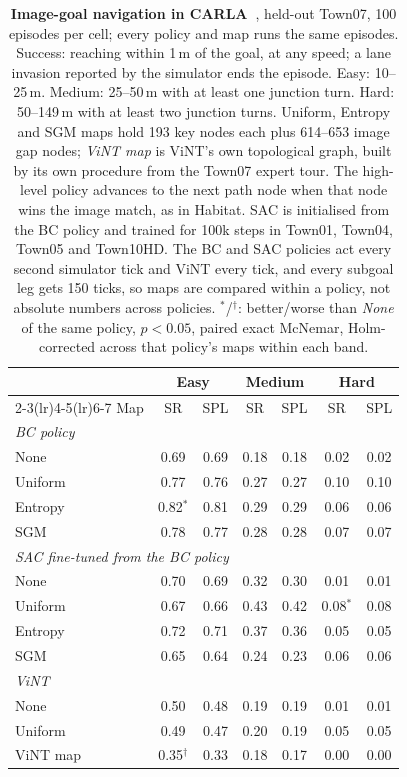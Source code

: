 \begin{table}[H]
\centering
\footnotesize
\setlength{\tabcolsep}{3.5pt}
\caption{\textbf{Image-goal navigation in CARLA~\cite{dosovitskiy2017carla}}, held-out Town07, 100 episodes per cell; every policy and map runs the same episodes. Success: reaching within 1\,m of the goal, at any speed; a lane invasion reported by the simulator ends the episode. Easy: 10--25\,m. Medium: 25--50\,m with at least one junction turn. Hard: 50--149\,m with at least two junction turns. Uniform, Entropy and SGM maps hold 193 key nodes each plus 614--653 image gap nodes; \emph{ViNT map} is ViNT's own topological graph, built by its own procedure from the Town07 expert tour. The high-level policy advances to the next path node when that node wins the image match, as in Habitat. SAC is initialised from the BC policy and trained for 100k steps in Town01, Town04, Town05 and Town10HD. The BC and SAC policies act every second simulator tick and ViNT every tick, and every subgoal leg gets 150 ticks, so maps are compared within a policy, not absolute numbers across policies. $^{*}$/$^{\dagger}$: better/worse than \emph{None} of the same policy, $p<0.05$, paired exact McNemar, Holm-corrected across that policy's maps within each band.}
\label{tab:map_navigation}
\begin{tabular}{lcccccc}
\toprule
 & \multicolumn{2}{c}{Easy} & \multicolumn{2}{c}{Medium} & \multicolumn{2}{c}{Hard} \\
\cmidrule(lr){2-3}\cmidrule(lr){4-5}\cmidrule(lr){6-7}
Map & SR & SPL & SR & SPL & SR & SPL \\
\midrule
\multicolumn{7}{l}{\textit{BC policy}} \\
None & 0.69 & 0.69 & 0.18 & 0.18 & 0.02 & 0.02 \\
Uniform & 0.77 & 0.76 & 0.27 & 0.27 & 0.10 & 0.10 \\
Entropy & 0.82$^{*}$ & 0.81 & 0.29 & 0.29 & 0.06 & 0.06 \\
SGM & 0.78 & 0.77 & 0.28 & 0.28 & 0.07 & 0.07 \\
\midrule
\multicolumn{7}{l}{\textit{SAC fine-tuned from the BC policy}} \\
None & 0.70 & 0.69 & 0.32 & 0.30 & 0.01 & 0.01 \\
Uniform & 0.67 & 0.66 & 0.43 & 0.42 & 0.08$^{*}$ & 0.08 \\
Entropy & 0.72 & 0.71 & 0.37 & 0.36 & 0.05 & 0.05 \\
SGM & 0.65 & 0.64 & 0.24 & 0.23 & 0.06 & 0.06 \\
\midrule
\multicolumn{7}{l}{\textit{ViNT}~\cite{shah2023vint}} \\
None & 0.50 & 0.48 & 0.19 & 0.19 & 0.01 & 0.01 \\
Uniform & 0.49 & 0.47 & 0.20 & 0.19 & 0.05 & 0.05 \\
ViNT map & 0.35$^{\dagger}$ & 0.33 & 0.18 & 0.17 & 0.00 & 0.00 \\
\bottomrule
\end{tabular}
\end{table}

